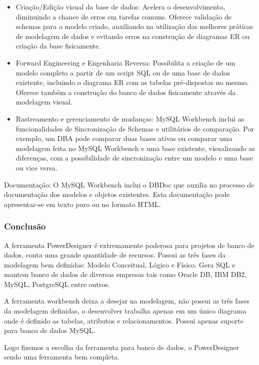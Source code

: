\documentclass[12pt,a4paper]{article}
\begin{document}
			\begin{itemize}
			  \item Criação/Edição visual da base de dados: Acelera o desenvolvimento, diminuindo a chance de erros em tarefas
			  comuns. Oferece validação de schemas para o modelo criado, auxiliando na utilização das melhores práticas de
			  modelagem de dados e evitando erros na construção de diagramas ER ou criação da base fisicamente.
			  \item Forward Engineering e Engenharia Reversa: Possibilita a criação de um modelo completo a partir de um script
			  SQL ou de uma base de dados existente, incluindo o diagrama ER com as tabelas pré-dispostas no mesmo. Oferece
			  também a construção do banco de dados fisicamente através da modelagem visual.
			  \item Rastreamento e gerenciamento de mudanças: MySQL Workbench inclui as funcionalidades de Sincronização de
			  Schemas e utilitários de comparação. Por exemplo, um DBA pode comparar duas bases ativas ou comparar uma modelagem
			  feita no MySQL Workbench e uma base existente, visualizando as diferenças, com a possibilidade de sincronização
			  entre um modelo e uma base ou vice versa.
			\end{itemize}

			Documentação: O MySQL Workbench inclui o DBDoc que auxilia no processo de documentação dos modelos e objetos
			existentes. Esta documentação pode apresentar-se em texto puro ou no formato HTML.
			
		\subsubsection{Conclusão}
			A ferramenta PowerDesigner é extremamente poderosa para projetos de banco de dados, conta uma grande quantidade de
			recursos. Possui as três fases da modelagem bem definidas: Modelo Conceitual, Lógico e Físico. Gera SQL e mantem
			banco de dados de diversas empresas tais como Oracle DB, IBM DB2, MySQL, PostgreSQL entre outros.
			 
			A ferramenta workbench deixa a desejar na modelagem, não possui as três fases da modelagem definidas, o desenvolver
			trabalha apenas em um único diagrama onde é definido as tabelas, atributos e relacionamentos. Possui apenas suporte
			para banco de dados MySQL.
			
			Logo fizemos a escolha da ferramenta para banco de dados, o PowerDesigner sendo uma ferramenta bem completa.
		
\end{document}

